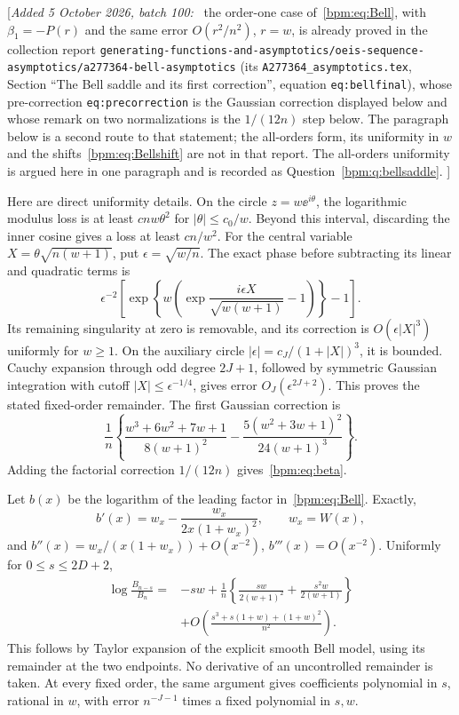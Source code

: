 \documentclass[11pt,a4paper]{article}
\theoremstyle{remark}\newtheorem{remark}[theorem]{Remark}%
\newenvironment{writenote}{\par\smallskip\noindent\small[\textit{Added 5 October 2026, batch 100:}\ }{]\par\smallskip}
\begin{document}
\begin{writenote}
the order-one case of~\eqref{bpm:eq:Bell}, with $\beta_1=-P(r)$ and the
same error $O(r^2/n^2)$, $r=w$, is already proved in the collection report
\nolinkurl{generating-functions-and-asymptotics/oeis-sequence-asymptotics/a277364-bell-asymptotics}
(its \nolinkurl{A277364_asymptotics.tex}, Section ``The Bell saddle and its
first correction'', equation \texttt{eq:bellfinal}), whose pre-correction
\texttt{eq:precorrection} is the Gaussian correction displayed below and
whose remark on two normalizations is the $1/(12n)$ step below. The
paragraph below is a second route to that statement; the all-orders form,
its uniformity in $w$ and the shifts~\eqref{bpm:eq:Bellshift} are not in
that report. The all-orders uniformity is argued here in one paragraph and
is recorded as Question~\ref{bpm:q:bellsaddle}.
\end{writenote}

Here are direct uniformity details. On the circle $z=w\ee^{i\theta}$, the logarithmic modulus loss is at least $c n w\theta^2$ for $|\theta|\le c_0/w$. Beyond this interval, discarding the inner cosine gives a loss at least $c n/w^2$. For the central variable $X=\theta\sqrt{n(w+1)}$, put $\epsilon=\sqrt{w/n}$. The exact phase before subtracting its linear and quadratic terms is
\[
 \epsilon^{-2}\left[\exp\left\{w\left(
 \exp\frac{i\epsilon X}{\sqrt{w(w+1)}}-1\right)\right\}-1\right].
\]
Its remaining singularity at zero is removable, and its correction is $O(\epsilon|X|^3)$ uniformly for $w\ge1$. On the auxiliary circle $|\epsilon|=c_J/(1+|X|)^3$, it is bounded. Cauchy expansion through odd degree $2J+1$, followed by symmetric Gaussian integration with cutoff $|X|\le\epsilon^{-1/4}$, gives error $O_J(\epsilon^{2J+2})$. This proves the stated fixed-order remainder. The first Gaussian correction is
\[
 \frac1n\left\{\frac{w^3+6w^2+7w+1}{8(w+1)^2}
       -\frac{5(w^2+3w+1)^2}{24(w+1)^3}\right\}.
\]
Adding the factorial correction $1/(12n)$ gives~\eqref{bpm:eq:beta}.

Let $b(x)$ be the logarithm of the leading factor in~\eqref{bpm:eq:Bell}. Exactly,
\[
 b'(x)=w_x-\frac{w_x}{2x(1+w_x)^2},\qquad w_x=W(x),
\]
and $b''(x)=w_x/(x(1+w_x))+O(x^{-2})$, $b'''(x)=O(x^{-2})$.
Uniformly for $0\le s\le2D+2$,
\begin{align}\label{bpm:eq:Bellshift}
 \log\frac{B_{n-s}}{B_n}
 ={}&-sw+\frac1n\left\{\frac{sw}{2(w+1)^2}
                     +\frac{s^2w}{2(w+1)}\right\}\nonumber\\
 &+O\!\left(\frac{s^3+s(1+w)+(1+w)^2}{n^2}\right).
\end{align}
This follows by Taylor expansion of the explicit smooth Bell model, using its remainder at the two endpoints. No derivative of an uncontrolled remainder is taken. At every fixed order, the same argument gives coefficients polynomial in $s$, rational in $w$, with error $n^{-J-1}$ times a fixed polynomial in $s,w$.
\end{document}
